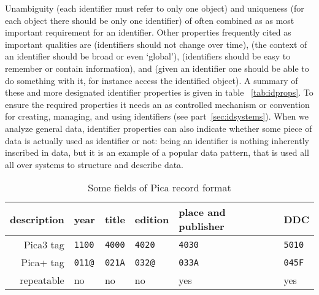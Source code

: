 Unambiguity (each identifier must refer to only one object) and uniqueness
(for each object there should be only one identifier) of often combined as
 as most important requirement for an identifier.
Other properties frequently cited as important qualities are 
(identifiers should not change over time),  (the context of an
identifier should be broad or even `global'),  (identifiers
should be easy to remember or contain information), and 
(given an identifier one should be able to do something with it,
for instance access the identified object). A summary of these and more
designated identifier properties is given in table~ \ref{tab:idprops}.
To ensure the required
properties it needs an  as controlled mechanism 
or convention for creating, managing, and using identifiers 
(see part~\ref{sec:idsystems}). When we analyze general data, identifier 
properties can also indicate whether some piece of data is actually used 
as identifier or not: being an identifier is nothing inherently inscribed 
in data, but it is an example of a popular data pattern, that is used all
all over systems to structure and describe data. 

\label{ex:picafieldids}

\begin{table}[h]
\centering
\begin{tabular}{r|l|l|l|l|l}
description & year        & title       & edition     &  place and publisher & DDC \\
\hline
Pica3 tag   & \verb|1100| & \verb|4000| & \verb|4020| & \verb|4030| & \verb|5010| \\
Pica+ tag   & \verb|011@| & \verb|021A| & \verb|032@| & \verb|033A| & \verb|045F| \\
repeatable  & no & no & no & yes & yes \\
\end{tabular}
\caption{Some fields of Pica record format}
\label{tab:pica3pp}
\end{table}

